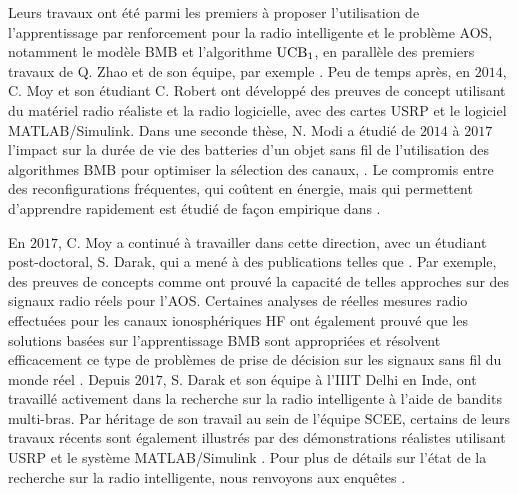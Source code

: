\begin{resume_fr}
Leurs travaux ont été parmi les premiers à proposer l'utilisation de l'apprentissage par renforcement pour la radio intelligente et le problème AOS, notamment le modèle BMB et l'algorithme $\mathrm{UCB}_1$,
en parallèle des premiers travaux de Q. Zhao et de son équipe, par exemple \cite{Liu08,Zhao10}.
%
Peu de temps après, en $2014$, C. Moy et son étudiant C. Robert \cite{RobertSDR2014,MoyWSR2014,MoyWSR2014} ont développé des preuves de concept utilisant du matériel radio réaliste et la radio logicielle, avec des cartes USRP et le logiciel MATLAB/Simulink.
Dans une seconde thèse, N. Modi a étudié de $2014$ à $2017$ l'impact sur la durée de vie des batteries d'un objet sans fil de l'utilisation des algorithmes BMB pour optimiser la sélection des canaux, \cite{Modi17PhD}.
Le compromis entre des reconfigurations fréquentes, qui coûtent en énergie, mais qui permettent d'apprendre rapidement est étudié de façon empirique dans \cite{modiDemo2016}.


En $2017$, C. Moy a continué à travailler dans cette direction, avec un étudiant post-doctoral, S. Darak, qui a mené à des publications telles que
\cite{darak2016bayesian,Darak16}.
%
Par exemple, des preuves de concepts comme \cite{kumar2016two} ont prouvé la capacité de telles approches sur des signaux radio réels pour l'AOS.
%
Certaines analyses de réelles mesures radio effectuées pour les canaux ionosphériques HF ont également prouvé que les solutions basées sur l'apprentissage BMB sont appropriées et résolvent efficacement ce type de problèmes de prise de décision sur les signaux sans fil du monde réel \cite{Melian15}.
%
Depuis $2017$, S. Darak et son équipe à l'IIIT Delhi en Inde, ont travaillé activement dans la recherche sur la radio intelligente à l'aide de bandits multi-bras.
Par héritage de son travail au sein de l'équipe SCEE,
certains de leurs travaux récents sont également illustrés par des démonstrations réalistes utilisant USRP et le système MATLAB/Simulink
\cite{KumarYadav2018,SawantKumar2018,JoshiKumar2018}.
%
Pour plus de détails sur l'état de la recherche sur la radio intelligente, nous renvoyons aux enquêtes \cite{garhwal2012survey,marinho2012cognitive}.



\end{resume_fr}
